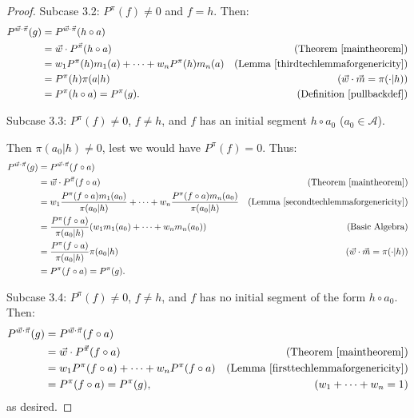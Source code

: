 \documentclass[twoside]{article}
\begin{document}
\begin{proof}
    Subcase 3.2: $P^\pi(f)\not=0$ and $f=h$. Then:
    \begin{align*}
        P^{\vec w\cdot\vec\pi}(g)
            &= P^{\vec w\cdot\vec\pi}(h\circ a)\\
            &= \vec w\cdot{P^{\vec\pi}}(h\circ a)
                    &\mbox{(Theorem \ref{maintheorem})}\\
            &= w_1P^\pi(h)m_1(a)+\cdots+w_nP^\pi(h)m_n(a)
                    &\mbox{(Lemma \ref{thirdtechlemmaforgenericity})}\\
            &= P^\pi(h)\pi(a|h)
                    &\mbox{($\vec w\cdot\vec m=\pi(\cdot|h)$)}\\
            &= P^\pi(h\circ a) = P^\pi(g).
                    &\mbox{(Definition \ref{pullbackdef})}
    \end{align*}

    Subcase 3.3: $P^\pi(f)\not=0$, $f\not=h$, and
    $f$ has an initial segment $h\circ a_0$ ($a_0\in\mathcal A$).

    Then $\pi(a_0|h)\not=0$, lest
    we would have $P^\pi(f)=0$. Thus:
    \begin{align*}
        P^{\vec w\cdot\vec\pi}(g)
            &= P^{\vec w\cdot \vec\pi}(f\circ a)\\
            &= \vec w\cdot{P^{\vec\pi}}(f\circ a)
                    &\mbox{(Theorem \ref{maintheorem})}\\
            &= w_1\frac{P^\pi(f\circ a)m_1(a_0)}{\pi(a_0|h)}
                +\cdots+w_n\frac{P^\pi(f\circ a)m_n(a_0)}{\pi(a_0|h)}
                    &\mbox{(Lemma \ref{secondtechlemmaforgenericity})}\\
            &= \frac{P^\pi(f\circ a)}{\pi(a_0|h)}(w_1m_1(a_0)+\cdots+w_nm_n(a_0))
                    &\mbox{(Basic Algebra)}\\
            &= \frac{P^\pi(f\circ a)}{\pi(a_0|h)}\pi(a_0|h)
                    &\mbox{($\vec w\cdot\vec m=\pi(\cdot|h)$)}\\
            &= P^\pi(f\circ a) = P^\pi(g).
    \end{align*}

    Subcase 3.4: $P^\pi(f)\not=0$, $f\not=h$, and $f$ has no initial segment
        of the form $h\circ a_0$. Then:
    \begin{align*}
        P^{\vec w\cdot\vec\pi}(g)
            &= P^{\vec w\cdot\vec\pi}(f\circ a)\\
            &= \vec w\cdot{P^{\vec\pi}}(f\circ a)
                    &\mbox{(Theorem \ref{maintheorem})}\\
            &= w_1P^\pi(f\circ a)+\cdots+w_nP^\pi(f\circ a)
                    &\mbox{(Lemma \ref{firsttechlemmaforgenericity})}\\
            &= P^\pi(f\circ a) = P^\pi(g),
                    &\mbox{($w_1+\cdots+w_n=1$)}
    \end{align*}
    as desired.
\end{proof}
\end{document}
